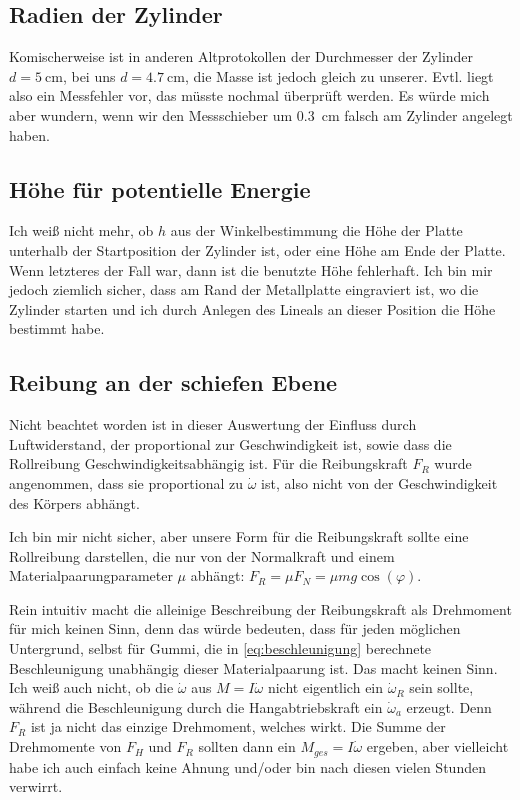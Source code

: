 \subsection{Radien der Zylinder}
Komischerweise ist in anderen Altprotokollen der Durchmesser der Zylinder \(d=\qty{5}{\cm}\), bei uns \(d=\qty{4.7}{\cm}\), die Masse ist jedoch gleich zu unserer. Evtl. liegt also ein Messfehler vor, das müsste nochmal überprüft werden. Es würde mich aber wundern, wenn wir den Messschieber um \qty{0.3}{\cm} falsch am Zylinder angelegt haben. 

\subsection{Höhe für potentielle Energie}
Ich weiß nicht mehr, ob \(h\) aus der Winkelbestimmung die Höhe der Platte unterhalb der Startposition der Zylinder ist, oder eine Höhe am Ende der Platte. Wenn letzteres der Fall war, dann ist die benutzte Höhe fehlerhaft. Ich bin mir jedoch ziemlich sicher, dass am Rand der Metallplatte eingraviert ist, wo die Zylinder starten und ich durch Anlegen des Lineals an dieser Position die Höhe bestimmt habe.
 
\subsection{Reibung an der schiefen Ebene}
Nicht beachtet worden ist in dieser Auswertung der Einfluss durch Luftwiderstand, der proportional zur Geschwindigkeit ist, sowie dass die Rollreibung Geschwindigkeitsabhängig ist. Für die Reibungskraft \(F_R\) wurde angenommen, dass sie proportional zu \(\dot{\omega}\) ist, also nicht von der Geschwindigkeit des Körpers abhängt.

Ich bin mir nicht sicher, aber unsere Form für die Reibungskraft sollte eine Rollreibung darstellen, die nur von der Normalkraft und einem Materialpaarungparameter \(\mu\) abhängt: \(F_R=\mu F_N=\mu mg\cos(\varphi)\).

Rein intuitiv macht die alleinige Beschreibung der Reibungskraft als Drehmoment für mich keinen Sinn, denn das würde bedeuten, dass für jeden möglichen Untergrund, selbst für Gummi, die in \cref{eq:beschleunigung} berechnete Beschleunigung unabhängig dieser Materialpaarung ist. Das macht keinen Sinn. Ich weiß auch nicht, ob die \(\dot{\omega}\) aus \(M=I\dot{\omega}\) nicht eigentlich ein \(\dot{\omega}_R\) sein sollte, während die Beschleunigung durch die Hangabtriebskraft ein \(\dot{\omega}_a\) erzeugt. Denn \(F_R\) ist ja nicht das einzige Drehmoment, welches wirkt. Die Summe der Drehmomente von \(F_H\) und \(F_R\) sollten dann ein \(M_{ges}=I\dot{\omega}\) ergeben, aber vielleicht habe ich auch einfach keine Ahnung und/oder bin nach diesen vielen Stunden verwirrt. 

